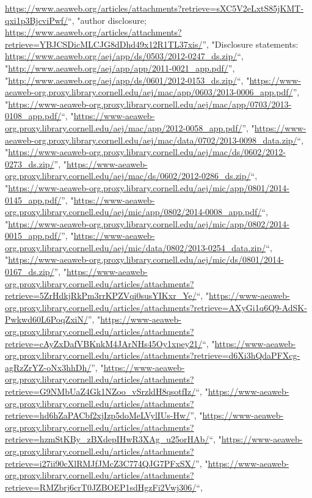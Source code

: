 \documentclass[]{article}
\begin{document}
\begin{itemize}
  \url{https://www.aeaweb.org/articles/attachments?retrieve=sXC5V2eLxtS85jKMT-qxi1p3BjcviPwf/}``,
  "author disclosure;
  \url{https://www.aeaweb.org/articles/attachments?retrieve=YBJCSDicMLCJG8dDhd49x12R1TL37xis/}'',
  "Disclosure statements:
  \url{https://www.aeaweb.org/aej/app/ds/0503/2012-0247_ds.zip/}``,
  "\url{http://www.aeaweb.org/aej/app/app/2011-0021_app.pdf/}'',
  "\url{http://www.aeaweb.org/aej/app/ds/0601/2012-0153_ds.zip/}``,
  "\url{https://www-aeaweb-org.proxy.library.cornell.edu/aej/mac/app/0603/2013-0006_app.pdf/}'',
  "\url{https://www-aeaweb-org.proxy.library.cornell.edu/aej/mac/app/0703/2013-0108_app.pdf/}``,
  "\url{https://www-aeaweb-org.proxy.library.cornell.edu/aej/mac/app/2012-0058_app.pdf/}'',
  "\url{https://www-aeaweb-org.proxy.library.cornell.edu/aej/mac/data/0702/2013-0098_data.zip/}``,
  "\url{https://www-aeaweb-org.proxy.library.cornell.edu/aej/mac/ds/0602/2012-0273_ds.zip/}'',
  "\url{https://www-aeaweb-org.proxy.library.cornell.edu/aej/mac/ds/0602/2012-0286_ds.zip/}``,
  "\url{https://www-aeaweb-org.proxy.library.cornell.edu/aej/mic/app/0801/2014-0145_app.pdf/}'',
  "\url{https://www-aeaweb-org.proxy.library.cornell.edu/aej/mic/app/0802/2014-0008_app.pdf/}``,
  "\url{https://www-aeaweb-org.proxy.library.cornell.edu/aej/mic/app/0802/2014-0015_app.pdf/}'',
  "\url{https://www-aeaweb-org.proxy.library.cornell.edu/aej/mic/data/0802/2013-0254_data.zip/}``,
  "\url{https://www-aeaweb-org.proxy.library.cornell.edu/aej/mic/ds/0801/2014-0167_ds.zip/}'',
  "\url{https://www-aeaweb-org.proxy.library.cornell.edu/articles/attachments?retrieve=5ZrHdkjRkPm3rrKPZVqi0susYIKxr_Ye/}``,
  "\url{https://www-aeaweb-org.proxy.library.cornell.edu/articles/attachments?retrieve=AXyGi1q6Q9-AdSK-Pwkwd60L6PoqZxiN/}'',
  "\url{https://www-aeaweb-org.proxy.library.cornell.edu/articles/attachments?retrieve=cAyZxDafVBKnkM4JArNHs45Oy1xpey21/}``,
  "\url{https://www-aeaweb-org.proxy.library.cornell.edu/articles/attachments?retrieve=d6Xi3hQdaPFXcg-agRzZrYZ-oNx3hhDh/}'',
  "\url{https://www-aeaweb-org.proxy.library.cornell.edu/articles/attachments?retrieve=G9NMbUaZ4Gk1NZoo_vSrzldH8qsotfIz/}``,
  "\url{https://www-aeaweb-org.proxy.library.cornell.edu/articles/attachments?retrieve=hd6hZaPACbf2xjIzp5doMeLVylIUs-Hw/}'',
  "\url{https://www-aeaweb-org.proxy.library.cornell.edu/articles/attachments?retrieve=hzmStKBy_zBXdepIHwR3XAg_u25orHAb/}``,
  "\url{https://www-aeaweb-org.proxy.library.cornell.edu/articles/attachments?retrieve=i27ii90cXlRMJfJMcZ3C774QJG7PFxSX/}'',
  "\url{https://www-aeaweb-org.proxy.library.cornell.edu/articles/attachments?retrieve=RMZbrj6crT0JZBOEP1sdHgzFi2Vwj306/}``,

\end{itemize}
\end{document}
